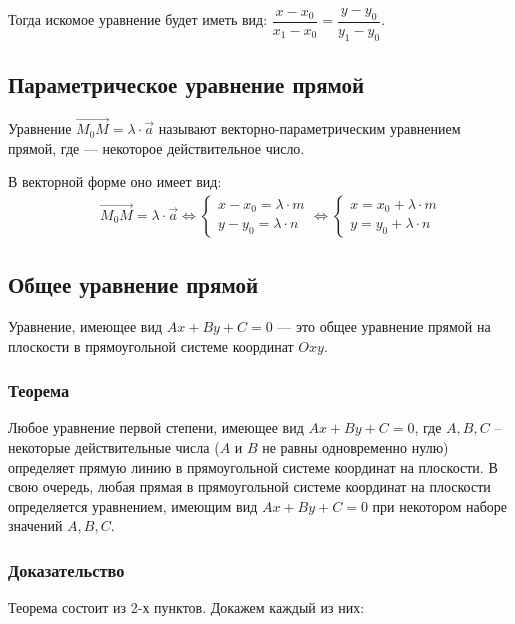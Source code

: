 \documentclass[12pt, fleqn]{extarticle}
\begin{document}
Тогда искомое уравнение будет иметь вид: \(\dfrac{x - x_0}{x_1 - x_0} = \dfrac{y - y_0}{y_1 - y_0}\).

\subsection*{Параметрическое уравнение прямой}

Уравнение \(\overrightarrow{M_0M} = \lambda \cdot \overrightarrow{a}\) называют векторно-параметрическим уравнением прямой, где \lambda — некоторое действительное число.

В векторной форме оно имеет вид:
\begin{align*}
     &  &
    \overrightarrow{M_0M} = \lambda \cdot \overrightarrow{a} \iff
    \begin{cases}
        x - x_0 = \lambda \cdot m \\
        y - y_0 = \lambda \cdot n
    \end{cases}
    \iff
    \begin{cases}
        x = x_0 + \lambda \cdot m \\
        y = y_0 + \lambda \cdot n
    \end{cases}
\end{align*}

\subsection*{Общее уравнение прямой}

Уравнение, имеющее вид \(Ax + By + C = 0\) — это общее уравнение прямой на плоскости в прямоугольной системе координат \(Oxy\).

\subsubsection*{Теорема}
Любое уравнение первой степени, имеющее вид \(Ax + By + C = 0\), где \(A, B, C\) – некоторые действительные числа (\(A\) и \(B\) не равны одновременно нулю) определяет прямую линию в прямоугольной системе координат на плоскости.
В свою очередь, любая прямая в прямоугольной системе координат на плоскости определяется уравнением, имеющим вид \(Ax + By + C = 0\) при некотором наборе значений \(A, B, C\).
\subsubsection*{Доказательство}
Теорема состоит из 2-х пунктов.
Докажем каждый из них: \\
\end{document}
